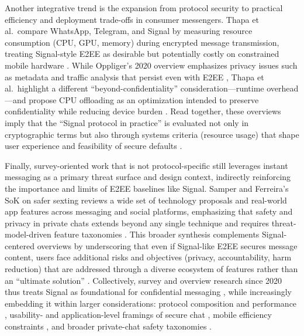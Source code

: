 Another integrative trend is the expansion from protocol security to practical efficiency and deployment trade-offs in consumer messengers. Thapa et al.\ compare WhatsApp, Telegram, and Signal by measuring resource consumption (CPU, GPU, memory) during encrypted message transmission, treating Signal-style E2EE as desirable but potentially costly on constrained mobile hardware \cite{thapa2025}. While Oppliger’s 2020 overview emphasizes privacy issues such as metadata and traffic analysis that persist even with E2EE \cite{oppliger2020}, Thapa et al.\ highlight a different “beyond-confidentiality” consideration—runtime overhead—and propose CPU offloading as an optimization intended to preserve confidentiality while reducing device burden \cite{thapa2025}. Read together, these overviews imply that the “Signal protocol in practice” is evaluated not only in cryptographic terms but also through systems criteria (resource usage) that shape user experience and feasibility of secure defaults \cite{thapa2025}.

Finally, survey-oriented work that is not protocol-specific still leverages instant messaging as a primary threat surface and design context, indirectly reinforcing the importance and limits of E2EE baselines like Signal. Samper and Ferreira’s SoK on safer sexting reviews a wide set of technology proposals and real-world app features across messaging and social platforms, emphasizing that safety and privacy in private chats extends beyond any single technique and requires threat-model-driven feature taxonomies \cite{samper2025}. This broader synthesis complements Signal-centered overviews by underscoring that even if Signal-like E2EE secures message content, users face additional risks and objectives (privacy, accountability, harm reduction) that are addressed through a diverse ecosystem of features rather than an “ultimate solution” \cite{samper2025}. Collectively, survey and overview research since 2020 thus treats Signal as foundational for confidential messaging \cite{oppliger2020,oppliger2024}, while increasingly embedding it within larger considerations: protocol composition and performance \cite{cao2022}, usability- and application-level framings of secure chat \cite{p2023}, mobile efficiency constraints \cite{thapa2025}, and broader private-chat safety taxonomies \cite{samper2025}.


